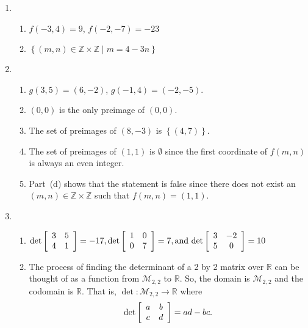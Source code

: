 \begin{enumerate}
\item \begin{enumerate}
\item $f( { - 3, 4} ) = 9$, $f( { - 2, - 7} ) =  - 23$

\item $\left\{ { {( {m, n} ) \in \mathbb{Z} \times \mathbb{Z} } \mid m = 4 - 3n} \right\}$
\end{enumerate}


\item \begin{enumerate}
\item $g ( 3, 5 ) = ( 6, -2 )$, \qquad
$g ( -1, 4 ) = ( -2, -5 )$.

\item $( 0, 0 )$ is the only preimage of $( 0, 0 )$.

\item The set of  preimages of $( 8, -3 )$ is $\left\{ ( 4, 7 ) \right\}$. 

\item The set of  preimages of $( 1, 1 )$ is $\emptyset$ since the first coordinate of $f(m, n)$ is always an even integer.

\item Part~(d) shows that the statement is false since there does not exist an 
$( m, n ) \in \mathbb{Z} \times \mathbb{Z}$ such that 
$f ( m, n ) = ( 1, 1 )$.
\end{enumerate}



\item \begin{enumerate}
\item $\det \left[ {\begin{array}{*{20}c}
   3 & 5  \\
   4 & 1  \\
\end{array} } \right] =  - 17, \det \left[ {\begin{array}{*{20}c}
   1 & 0  \\
   0 & 7  \\
 \end{array} } \right] = 7, \text{and det}\left[ {\begin{array}{*{20}c}
   3 & { - 2}  \\
   5 & 0  \\
 \end{array} } \right] = 10$

\item The process of finding the determinant of a 2 by 2 matrix over $\mathbb{R}$ can be thought of as a function from $\mathcal{M}_{2, 2}$ to $\mathbb{R}$.  So, the domain is 
$\mathcal{M}_{2, 2}$ and the codomain is $\mathbb{R}$.  That is, 
$\det : \mathcal{M}_{2, 2} \to \mathbb{R}$ where
\[
\det \left[ {\begin{array}{*{20}c}
   a & b  \\
   c & d  \\
\end{array} } \right] = ad - bc.
\]
\end{enumerate}


\end{enumerate}
